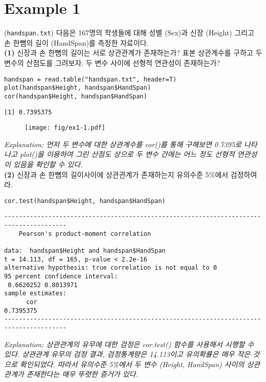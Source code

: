 \documentclass{article}
\begin{document}
\pagestyle{fancy}

\section*{Example 1}
(\texttt{handspan.txt}) 다음은 167명의 학생들에 대해 성별 (Sex)과 신장 (Height) 그리고 손 한뼘의 길이 (HandSpan)를 측정한 자료이다.\\

\textbf{(1)} 신장과 손 한뼘의 길이는 서로 상관관계가 존재하는가? 표본 상관계수를 구하고 두 변수의 산점도를 그려보자. 두 변수 사이에 선형적 연관성이 존재하는가?

\begin{lstlisting}[style={r-style}]
handspan = read.table("handspan.txt", header=T)
plot(handspan$Height, handspan$HandSpan)
cor(handspan$Height, handspan$HandSpan)
\end{lstlisting}
\begin{lstlisting}[style={out-style}]
[1] 0.7395375
\end{lstlisting}
\begin{figure}[htb!]
    \centering
    \texttt{[image: fig/ex1-1.pdf]}
\end{figure}
\emph{Explanation: 먼저 두 변수에 대한 상관계수를 cor()를 통해 구해보면 0.7395로 나타나고 plot()을 이용하여 그린 산점도 상으로 두 변수 간에는 어느 정도 선형적 연관성이 있음을 확인할 수 있다. } \\

\textbf{(2)} 신장과 손 한뼘의 길이사이에 상관관계가 존재하는지 유의수준 5\%에서 검정하여라.

\begin{lstlisting}[style={r-style}]
cor.test(handspan$Height, handspan$HandSpan)
\end{lstlisting}
\begin{lstlisting}[style={out-style}]
---------------------------------------------------------------------------------------
	Pearson's product-moment correlation

data:  handspan$Height and handspan$HandSpan
t = 14.113, df = 165, p-value < 2.2e-16
alternative hypothesis: true correlation is not equal to 0
95 percent confidence interval:
 0.6620252 0.8013971
sample estimates:
      cor 
0.7395375 
---------------------------------------------------------------------------------------
\end{lstlisting}
\emph{Explanation: 상관관계의 유무에 대한 검정은 cor.test() 함수를 사용해서 시행할 수 있다. 상관관계 유무의
검정 결과, 검정통계량은 14.113이고 유의확률은 매우 작은 것으로 확인되었다. 따라서 유의수준 5\%에서 두 변수 (Height, HandSpan) 사이의 상관관계가 존재한다는 매우 뚜렷한 증거가 있다.} \\
\end{document}

